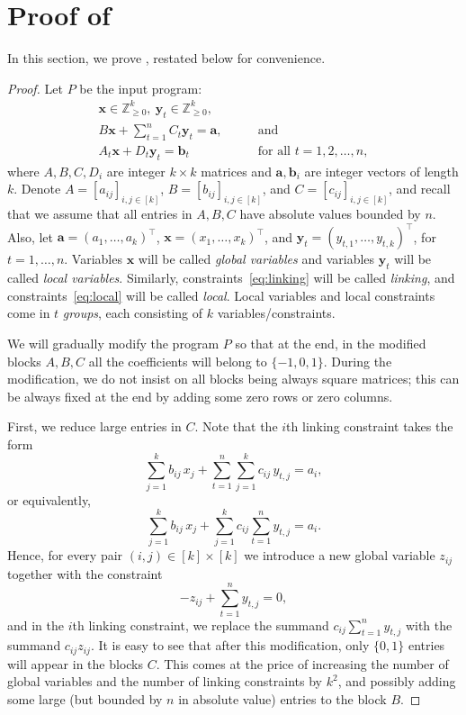 \documentclass{theoretics}
\renewcommand{\geq}{\geqslant}
\newcommand{\Z}{\mathbb{Z}}
\newcommand{\Zn}{\Z_{\geq 0}}
\newcommand{\tup}[1]{{\mathbf{#1}}}
\newcommand{\xx}{\tup x}
\newcommand{\yy}{\tup y}
\newcommand{\av}{\tup a}
\newcommand{\bb}{\tup b}
\begin{document}
\printbibliography

\newpage
\appendix
\section{Proof of \texorpdfstring{}{Observation \ref{obs:4block}}}\label{app:4block}

In this section, we prove , restated below for convenience.

\fourblock*

\begin{proof}
    Let $P$ be the input program:
    \begin{align}
 \xx\in \Zn^k,\ \yy_t\in \Zn^k, &\nonumber\\
     B\xx+\sum_{t=1}^n C_t\yy_t = \av, & \qquad \textrm{and}\label{eq:linking} \\
 A_t\xx + D_t\yy_t =\bb_t &\qquad \textrm{for all }t=1,2,\ldots,n,\label{eq:local}
    \end{align}
    where $A,B,C,D_i$ are integer $k\times k$ matrices and $\av,\bb_i$ are integer vectors of length $k$. Denote $A=[a_{ij}]_{i,j\in [k]}$, $B=[b_{ij}]_{i,j\in [k]}$, and $C=[c_{ij}]_{i,j\in [k]}$, and recall that we assume that all entries in $A,B,C$ have absolute values bounded by $n$. Also, let $\av=(a_1,\ldots,a_k)^\intercal$, $\xx=(x_1,\ldots,x_k)^\intercal$, and $\yy_t=(y_{t,1},\ldots,y_{t,k})^\intercal$, for $t=1,\ldots,n$. Variables $\xx$ will be called {\em{global variables}} and variables $\yy_t$ will be called {\em{local variables}}. Similarly, constraints~\eqref{eq:linking} will be called {\em{linking}}, and constraints~\eqref{eq:local} will be called {\em{local}}. Local variables and local constraints come in $t$ {\em{groups}}, each consisting of $k$ variables/constraints.

    We will gradually modify the program $P$ so that at the end, in the modified blocks $A,B,C$ all the coefficients will belong to $\{-1,0,1\}$. During the modification, we do not insist on all blocks being always square matrices; this can be always fixed at the end by adding some zero rows or zero columns.

    First, we reduce large entries in $C$. Note that the $i$th linking constraint takes the form
    $$\sum_{j=1}^k b_{ij}\,x_j + \sum_{t=1}^n \sum_{j=1}^k c_{ij}\,y_{t,j}= a_i,$$
    or equivalently,
    $$\sum_{j=1}^k b_{ij}\,x_j + \sum_{j=1}^k c_{ij}\sum_{t=1}^n  y_{t,j}= a_i.$$
    Hence, for every pair $(i,j)\in [k]\times [k]$ we introduce a new global variable $z_{ij}$ together with the constraint
    $$-z_{ij}+\sum_{t=1}^n y_{t,j}=0,$$
    and in the $i$th linking constraint, we replace the summand $c_{ij}\sum_{t=1}^n  y_{t,j}$ with the summand $c_{ij}z_{ij}$. It is easy to see that after this modification, only $\{0,1\}$ entries will appear in the blocks $C$. This comes at the price of increasing the number of global variables and the number of linking constraints by $k^2$, and possibly adding some large (but bounded by $n$ in absolute value) entries to the block $B$.


\end{proof}
\end{document}
